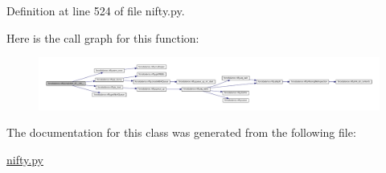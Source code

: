 \-Definition at line 524 of file nifty.\-py.



\-Here is the call graph for this function\-:\nopagebreak
\begin{figure}[H]
\begin{center}
\leavevmode
\includegraphics[width=350pt]{classforcebalance_1_1nifty_1_1Unpickler__LP_ab1662d984cbb593543f4b73243b32ba3_cgraph}
\end{center}
\end{figure}




\-The documentation for this class was generated from the following file\-:\begin{DoxyCompactItemize}
\item 
\hyperlink{nifty_8py}{nifty.\-py}\end{DoxyCompactItemize}
